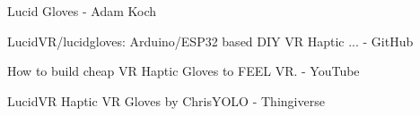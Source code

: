 \documentclass{article}
\begin{document}
\begin{thebibliography}{9}
     \begin{minipage}[c]{0.15\textwidth}\end{minipage}\begin{minipage}[c]{0.8\textwidth}Lucid Gloves - Adam Koch\end{minipage}
     \begin{minipage}[c]{0.15\textwidth}\end{minipage}\begin{minipage}[c]{0.8\textwidth}LucidVR/lucidgloves: Arduino/ESP32 based DIY VR Haptic ... - GitHub\end{minipage}
     \begin{minipage}[c]{0.15\textwidth}\end{minipage}\begin{minipage}[c]{0.8\textwidth}How to build cheap VR Haptic Gloves to FEEL VR. - YouTube\end{minipage}
     \begin{minipage}[c]{0.15\textwidth}\end{minipage}\begin{minipage}[c]{0.8\textwidth}LucidVR Haptic VR Gloves by ChrisYOLO - Thingiverse\end{minipage}
\end{thebibliography}
\end{document}
